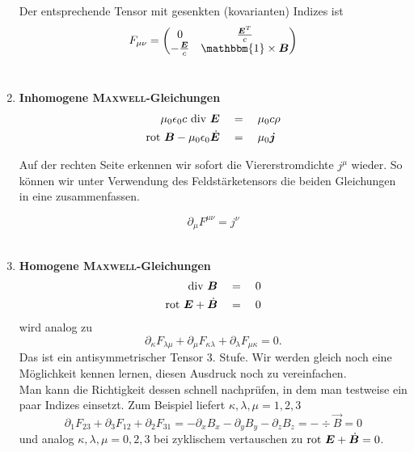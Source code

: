 \begin{enumerate}
\begin{equation*}
\end{equation*}
Der entsprechende Tensor mit gesenkten (kovarianten) Indizes ist
\begin{equation*}
F_{\mu\nu}= \begin{pmatrix}
0 & \frac{\vec{E}^T}{c} \\
-\frac{\vec{E}}{c} & \mathbbm{1}\times\vec{B}\end{pmatrix}
\end{equation*}
\ \\
\item \textbf{ Inhomogene \textsc{Maxwell}-Gleichungen}
\begin{align*}
\mu_0\epsilon_0 c \ \text{div }\bm{E}\quad&=\quad\mu_0c\rho\\
\text{rot } \bm{B} -\mu_0\epsilon_0\dot{\bm{E}}\quad&=\quad\mu_0\bm{j}
\end{align*}

Auf der rechten Seite erkennen wir sofort die Viererstromdichte $j^\mu$ wieder. So können wir unter Verwendung des Feldstärketensors die beiden Gleichungen in eine zusammenfassen.

\begin{equation*}
\partial_\mu F^{\mu\nu} =j^\nu
\end{equation*}
\ \\

\item \textbf{ Homogene \textsc{Maxwell}-Gleichungen}
\begin{align*}
\text{div }\bm{B}\quad &=\quad 0\\
\text{rot }\bm{E}+\dot{\bm{B}}\quad &=\quad 0
\end{align*}
wird analog zu
\begin{equation*}
\partial_\kappa F_{\lambda\mu} + \partial_\mu F_{\kappa\lambda}+\partial_\lambda F_{\mu\kappa} = 0.
\end{equation*}
Das ist ein antisymmetrischer Tensor 3. Stufe. Wir werden gleich noch eine Möglichkeit kennen lernen, diesen Ausdruck noch zu vereinfachen. \\
Man kann die Richtigkeit dessen schnell nachprüfen, in dem man testweise ein paar Indizes einsetzt. Zum Beispiel liefert $\kappa,\lambda,\mu=1,2,3$
\begin{equation*}
\partial_1 F_{23}+\partial_3 F_{12} + \partial_2 F_{31} = -\partial_x B_x - \partial_y B_y - \partial_z B_z = -\div\vec{B}= 0
\end{equation*}
und analog $\kappa,\lambda,\mu = 0,2,3$ bei zyklischem vertauschen zu $\text{rot }\bm{E}+\dot{\bm{B}} = 0$. \\


\end{enumerate}
